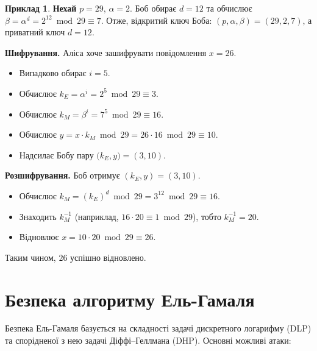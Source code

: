\documentclass[12pt]{report}
\theoremstyle{definition}
\newtheorem{example}{Приклад}[chapter]
\theoremstyle{plain}
\begin{document}
\begin{example}
\textbf{Нехай} \(p = 29\), \(\alpha = 2\). Боб обирає \(d = 12\) та обчислює \(\beta = \alpha^d = 2^{12} \bmod 29 \equiv 7\). Отже, відкритий ключ Боба: \((p, \alpha, \beta) = (29, 2, 7)\), а приватний ключ \(d = 12\).

\textbf{Шифрування.} Аліса хоче зашифрувати повідомлення \(x = 26\).
\begin{itemize}
    \item Випадково обирає \(i = 5\).
    \item Обчислює \(k_E = \alpha^i = 2^5 \bmod 29 \equiv 3\).
    \item Обчислює \(k_M = \beta^i = 7^5 \bmod 29 \equiv 16\).
    \item Обчислює \(y = x \cdot k_M \bmod 29 = 26 \cdot 16 \bmod 29 \equiv 10\).
    \item Надсилає Бобу пару \(\bigl(k_E, y\bigr) = (3, 10)\).
\end{itemize}

\textbf{Розшифрування.} Боб отримує \((k_E, y) = (3, 10)\).
\begin{itemize}
    \item Обчислює \(k_M = (k_E)^d \bmod 29 = 3^{12} \bmod 29 \equiv 16\).
    \item Знаходить \(k_M^{-1}\) (наприклад, \(16 \cdot 20 \equiv 1 \bmod 29\)), тобто \(k_M^{-1} = 20\).
    \item Відновлює \(x = 10 \cdot 20 \bmod 29 \equiv 26\).
\end{itemize}

Таким чином, \(26\) успішно відновлено.
\end{example}

\section{Безпека алгоритму Ель-Гамаля}

Безпека Ель-Гамаля базується на складності задачі дискретного логарифму (DLP) та спорідненої з нею задачі Діффі–Геллмана (DHP). Основні можливі атаки:
\end{document}
